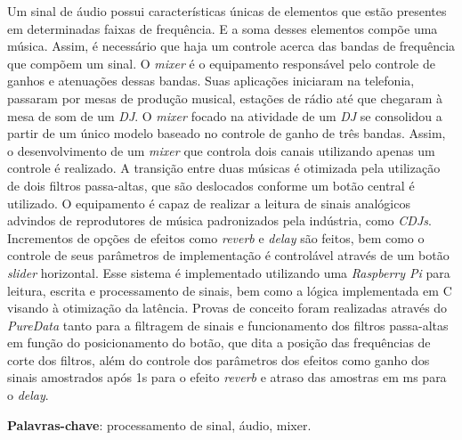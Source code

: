 \begin{resumo}
    Um sinal de áudio possui características únicas de elementos que estão presentes em determinadas faixas de frequência. E a soma desses elementos compõe uma música.
    Assim, é necessário que haja um controle acerca das bandas de frequência que compõem um sinal. O \textit{mixer} é o equipamento responsável pelo controle de ganhos e atenuações dessas bandas. Suas aplicações iniciaram na telefonia, passaram por mesas de produção musical, estações de rádio até que chegaram à mesa de som de um \textit{DJ}. O \textit{mixer} focado na atividade de um \textit{DJ} se consolidou a partir de um único modelo baseado no controle de ganho de três bandas. Assim, o desenvolvimento de um \textit{mixer} que controla dois canais utilizando apenas um controle é realizado. A transição entre duas músicas é otimizada pela utilização de dois filtros passa-altas, que são deslocados conforme um botão central é utilizado. O equipamento é capaz de realizar a leitura de sinais analógicos advindos de reprodutores de música padronizados pela indústria, como \textit{CDJs}. Incrementos de opções de efeitos como \textit{reverb} e \textit{delay} são feitos, bem como o controle de seus parâmetros de implementação é controlável através de um botão \textit{slider} horizontal. Esse sistema é implementado utilizando uma \textit{Raspberry Pi} para leitura, escrita e processamento de sinais, bem como a lógica implementada em C visando à otimização da latência. Provas de conceito foram realizadas através do \textit{PureData} tanto para a filtragem de sinais e funcionamento dos filtros passa-altas em função do posicionamento do botão, que dita a posição das frequências de corte dos filtros, além do controle dos parâmetros dos efeitos como ganho dos sinais amostrados após 1s para o efeito \textit{reverb} e atraso das amostras em ms para o \textit{delay}.

 \vspace{\onelineskip}
    
 \noindent
 \textbf{Palavras-chave}: processamento de sinal, áudio, mixer.
\end{resumo}
